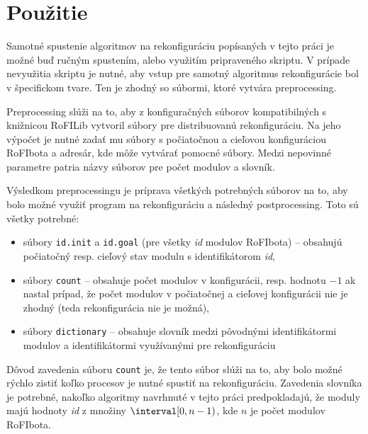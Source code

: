 \documentclass[
  digital, %
  oneside, %
  table,   %
  lof,     %
  nolot,     %
]{fithesis3}
\begin{document}
\newcommand{\comment}[1]{}
\comment{
Z pohľadu hardvérového vybavenia sú kladené obmedzenia výhradne pri používaní distribuovanej rekonfigurácie. Nakoľko je každý modul reprezentovaný jedným procesom, tak je nutné mať hardvér, ktorý je schopný pustiť toľko procesov ako je počet modulov RoFIbota, ktorého rekonfiguráciu ideme simulovať. }

\section{Použitie}
Samotné spustenie algoritmov na rekonfiguráciu popísaných v tejto práci je možné buď ručným spustením, alebo využitím pripraveného skriptu. V prípade nevyužitia skriptu je nutné, aby vstup pre samotný algoritmus rekonfigurácie bol v špecifickom tvare. Ten je zhodný so súbormi, ktoré vytvára preprocessing. 

Preprocessing slúži na to, aby z konfiguračných súborov kompatibilných s knižnicou RoFILib vytvoril súbory pre distribuovanú rekonfiguráciu. Na jeho výpočet je nutné zadať mu súbory s počiatočnou a cieľovou konfiguráciou RoFIbota a adresár, kde môže vytvárať pomocné súbory. Medzi nepovinné parametre patria názvy súborov pre počet modulov a slovník. 

Výsledkom preprocessingu je príprava všetkých potrebných súborov na to, aby bolo možné využiť program na rekonfiguráciu a následný postprocessing. Toto sú všetky potrebné: 
\begin{itemize}
    \item súbory \texttt{id.init} a \texttt{id.goal} (pre všetky \textit{id} modulov RoFIbota) -- obsahujú počiatočný resp. cieľový stav modulu s identifikátorom \textit{id}, 
    \item súbory \texttt{count} -- obsahuje počet modulov v konfigurácii, resp. hodnotu $-1$ ak nastal prípad, že počet modulov v počiatočnej a cieľovej konfigurácii nie je zhodný (teda rekonfigurácia nie je možná), 
    \item súbory \texttt{dictionary} -- obsahuje slovník medzi pôvodnými identifikátormi modulov a identifikátormi využívanými pre rekonfiguráciu
\end{itemize}

Dôvod zavedenia súboru \texttt{count} je, že tento súbor slúži na to, aby bolo možné rýchlo zistiť koľko procesov je nutné spustiť na rekonfiguráciu. Zavedenia slovníka je potrebné, nakoľko algoritmy navrhnuté v tejto práci predpokladajú, že moduly majú hodnoty \textit{id} z množiny $\interval[0, n - 1)$, kde $n$ je počet modulov RoFIbota.
\end{document}
